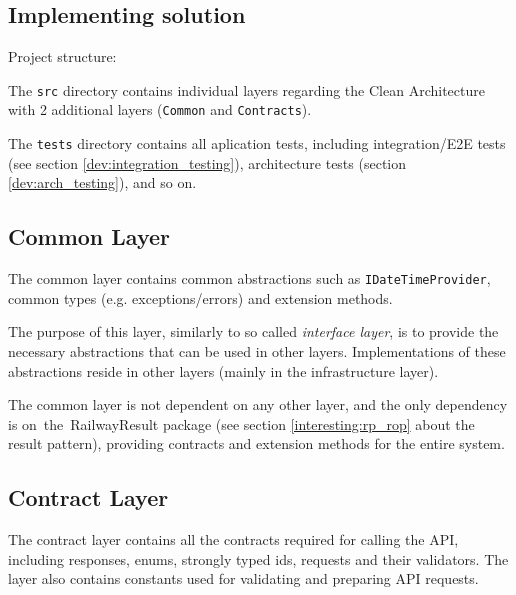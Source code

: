 \subsection{Implementing solution}
Project structure: \vspace{6pt}


The \texttt{src} directory contains individual layers regarding the Clean Architecture with 2 additional layers (\texttt{Common} and \texttt{Contracts}).

The \texttt{tests} directory contains all aplication tests, including integration/E2E tests (see section \ref{dev:integration_testing}), architecture tests (section \ref{dev:arch_testing}), and so on.

\subsection{Common Layer}
The common layer contains common abstractions such as \texttt{IDateTimeProvider}, common types (e.g. exceptions/errors) and extension methods. 
 
The purpose of this layer, similarly to so called \textit{interface layer}, is to provide the necessary abstractions that can be used in other layers. Implementations of these abstractions reside in other layers (mainly in the infrastructure layer).

The common layer is not dependent on any other layer, and the only dependency is on~the~RailwayResult package (see section \ref{interesting:rp_rop} about the result pattern), providing contracts and extension methods for the entire system.

\subsection{Contract Layer}
The contract layer contains all the contracts required for calling the API, including responses, enums, strongly typed ids, requests and their validators. The layer also contains constants used for validating and preparing API requests.

